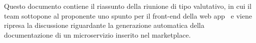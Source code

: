 Questo documento contiene il riassunto della riunione di tipo valutativo, in cui il team sottopone al proponente uno spunto per il front-end della web app \progetto\ e viene ripresa la discussione riguardante la generazione automatica della documentazione di un microservizio inserito nel marketplace.
